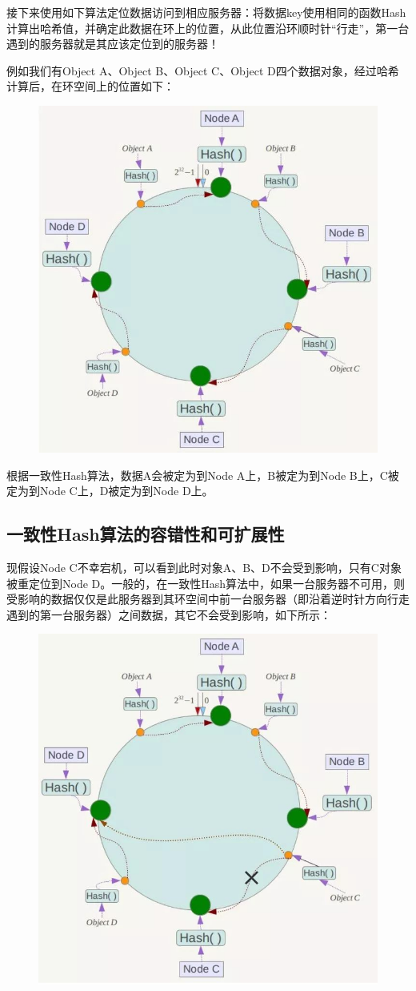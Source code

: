 \documentclass[12pt]{article}
\begin{document}
接下来使用如下算法定位数据访问到相应服务器：将数据key使用相同的函数Hash计算出哈希值，并确定此数据在环上的位置，从此位置沿环顺时针“行走”，第一台遇到的服务器就是其应该定位到的服务器！

例如我们有Object A、Object B、Object C、Object D四个数据对象，经过哈希计算后，在环空间上的位置如下：
\begin{figure}[H]
    \centering
    \includegraphics[width=.5\textwidth]{fig/Consistent_Hashing_7.jpg}
\end{figure}

根据一致性Hash算法，数据A会被定为到Node A上，B被定为到Node B上，C被定为到Node C上，D被定为到Node D上。

\subsection{一致性Hash算法的容错性和可扩展性}
现假设Node C不幸宕机，可以看到此时对象A、B、D不会受到影响，只有C对象被重定位到Node D。一般的，在一致性Hash算法中，如果一台服务器不可用，则受影响的数据仅仅是此服务器到其环空间中前一台服务器（即沿着逆时针方向行走遇到的第一台服务器）之间数据，其它不会受到影响，如下所示：
\begin{figure}[H]
    \centering
    \includegraphics[width=.5\textwidth]{fig/Consistent_Hashing_8.jpg}
\end{figure}
\end{document}
